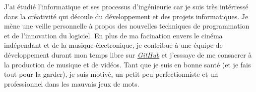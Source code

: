 J'ai étudié l'informatique et ses processus d'ingénieurie car je suis très intérressé dans la créativité qui découle du développement et des projets informatiques. Je mène une veille personnelle à propos des nouvelles techniques de programmation et de l'innovation du logiciel.
En plus de ma facination envers le cinéma indépendant et de la musique électronique, je contribue à une équipe de développement durant mon temps libre sur \href{https://github.com/team-chiru}{\textit{GitHub}} et j'esssaye de me consacrer à la production de musique et de vidéos.
Tant que je suis en bonne santé (et je fais tout pour la garder), je suis motivé, un petit peu perfectionniste et un professionnel dans les mauvais jeux de mots.
\vspace{.25em}

